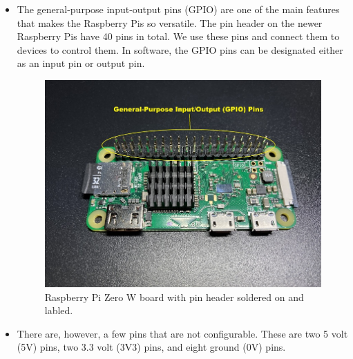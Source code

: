 \documentclass{article}\usepackage[]{graphicx}\usepackage[]{color}
\begin{document}
\begin{itemize}

\item The general-purpose input-output pins (GPIO) are one of the main features that makes the Raspberry Pis so versatile. The pin header on the newer Raspberry Pis have 40 pins in total. We use these pins and connect them to devices to control them. In software, the GPIO pins can be designated either as an input pin or output pin.
\begin{figure}[h]
\begin{center}
\includegraphics[width=1.00\textwidth]{pinheader}
\caption{Raspberry Pi Zero W board with pin header soldered on and labled.\label{fig:pinheader}}
\end{center}
\end{figure}
\item There are, however, a few pins that are not configurable. These are two 5 volt (5V) pins, two 3.3 volt (3V3) pins, and eight ground (0V) pins.
\begin{figure}
\begin{center}

\end{center}
\end{figure}
\end{itemize}
\end{document}

